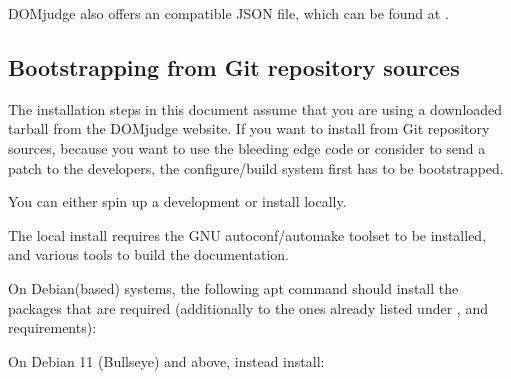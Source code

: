 \documentclass[a4paper,10pt,english,openany]{sphinxmanual}
\begin{document}
\sphinxAtStartPar
DOMjudge also offers an 
compatible JSON file, which can be found at
.


\subsection{Bootstrapping from Git repository sources}
\label{\detokenize{develop:bootstrapping-from-git-repository-sources}}\label{\detokenize{develop:bootstrap}}
\sphinxAtStartPar
The installation steps in this document assume that you are using a
downloaded tarball from the DOMjudge website. If you want to install
from Git repository sources, because you want to use the bleeding edge
code or consider to send a patch to the developers, the
configure/build system first has to be bootstrapped.

\sphinxAtStartPar
You can either spin up a development  or install locally.

\sphinxAtStartPar
The local install requires the GNU autoconf/automake toolset to be installed,
and various tools to build the documentation.

\sphinxAtStartPar
On Debian(\sphinxhyphen{}based) systems, the following apt command should
install the packages that are required (additionally to the ones
already listed under
{\hyperref[\detokenize{install-domserver:domserver-requirements}]{}},
{\hyperref[\detokenize{install-judgehost:judgehost-requirements}]{}} and
{\hyperref[\detokenize{install-workstation:submit-client-requirements}]{}} requirements):

\begin{sphinxVerbatim}[commandchars=\\\{\}]
      \PYGZbs{}
       
\end{sphinxVerbatim}

\sphinxAtStartPar
On Debian 11 (Bullseye) and above, instead install:
\end{document}

